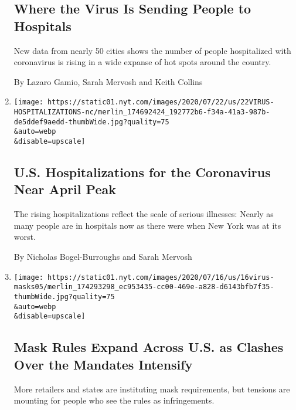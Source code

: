 \begin{enumerate}
  \hypertarget{where-the-virus-is-sending-people-to-hospitals}{%
  \subsection{Where the Virus Is Sending People to
  Hospitals}\label{where-the-virus-is-sending-people-to-hospitals}}

  New data from nearly 50 cities shows the number of people hospitalized
  with coronavirus is rising in a wide expanse of hot spots around the
  country.

  By Lazaro Gamio, Sarah Mervosh and Keith Collins
\item
  \href{/2020/07/22/us/coronavirus-hospitalizations-near-peak.html}{}

  \texttt{[image: https://static01.nyt.com/images/2020/07/22/us/22VIRUS-HOSPITALIZATIONS-nc/merlin\_174692424\_192772b6-f34a-41a3-987b-de5ddef9aedd-thumbWide.jpg?quality=75\\\&auto=webp\\\&disable=upscale]}

  \hypertarget{us-hospitalizations-for-the-coronavirus-near-april-peak}{%
  \subsection{U.S. Hospitalizations for the Coronavirus Near April
  Peak}\label{us-hospitalizations-for-the-coronavirus-near-april-peak}}

  The rising hospitalizations reflect the scale of serious illnesses:
  Nearly as many people are in hospitals now as there were when New York
  was at its worst.

  By Nicholas Bogel-Burroughs and Sarah Mervosh
\item
  \href{/2020/07/16/us/coronavirus-masks.html}{}

  \texttt{[image: https://static01.nyt.com/images/2020/07/16/us/16virus-masks05/merlin\_174293298\_ec953435-cc00-469e-a828-d6143bfb7f35-thumbWide.jpg?quality=75\\\&auto=webp\\\&disable=upscale]}

  \hypertarget{mask-rules-expand-across-us-as-clashes-over-the-mandates-intensify}{%
  \subsection{Mask Rules Expand Across U.S. as Clashes Over the Mandates
  Intensify}\label{mask-rules-expand-across-us-as-clashes-over-the-mandates-intensify}}

  More retailers and states are instituting mask requirements, but
  tensions are mounting for people who see the rules as infringements.


\end{enumerate}
